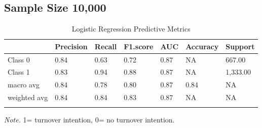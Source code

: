 \documentclass[
  man]{apa7}
\begin{document}
\hypertarget{sample-size-10000}{%
\subsection{Sample Size 10,000}\label{sample-size-10000}}

\begin{table}[tbp]

\begin{center}
\begin{threeparttable}

\caption{\label{tab:logitable10k}Logistic Regression Predictive Metrics}

\begin{tabular}{lllllll}
\toprule
 & \multicolumn{1}{c}{Precision} & \multicolumn{1}{c}{Recall} & \multicolumn{1}{c}{F1.score} & \multicolumn{1}{c}{AUC} & \multicolumn{1}{c}{Accuracy} & \multicolumn{1}{c}{Support}\\
\midrule
Class 0 & 0.84 & 0.63 & 0.72 & 0.87 & NA & 667.00\\
Class 1 & 0.83 & 0.94 & 0.88 & 0.87 & NA & 1,333.00\\
macro avg & 0.84 & 0.78 & 0.80 & 0.87 & 0.84 & NA\\
weighted avg & 0.84 & 0.84 & 0.83 & 0.87 & NA & NA\\
\bottomrule
\addlinespace
\end{tabular}

\begin{tablenotes}[para]
\normalsize{\textit{Note.} 1= turnover intention, 0= no turnover intention.}
\end{tablenotes}

\end{threeparttable}
\end{center}

\end{table}
\end{document}
